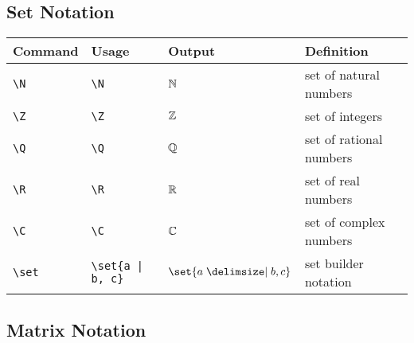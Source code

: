 \documentclass[11pt]{article}
\begin{document}
\subsection{Set Notation}

\begin{tabular}{llll}
    Command     & Usage                 & Output                & Definition              \\
    \hline
    \verb|\N|   & \verb|\N|             & $\mathbb{N}$                  & set of natural numbers  \\
    \verb|\Z|   & \verb|\Z|             & $\mathbb{Z}$                  & set of integers         \\
    \verb|\Q|   & \verb|\Q|             & $\mathbb{Q}$                  & set of rational numbers \\
    \verb|\R|   & \verb|\R|             & $\mathbb{R}$                  & set of real numbers     \\
    \verb|\C|   & \verb|\C|             & $\mathbb{C}$                  & set of complex numbers  \\
    \verb|\set| & \verb=\set{a | b, c}= & $\set{a \given b, c}$ & set builder notation    \\
\end{tabular}

\subsection{Matrix Notation}
\end{document}

